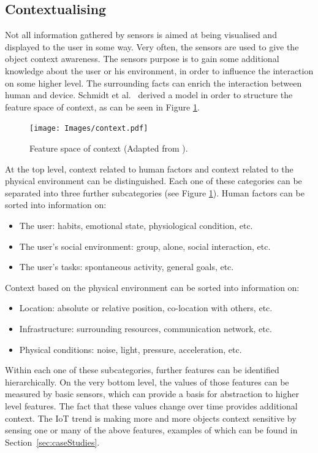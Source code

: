 \subsection{Contextualising}
Not all information gathered by sensors is aimed at being visualised and displayed to the user in some way. 
Very often, the sensors are used to give the object context awareness.
The sensors purpose is to gain some additional knowledge about the user or his environment, in order to influence the interaction on some higher level. 
The surrounding facts can enrich the interaction between human and device. 
Schmidt et al.\ \cite{schmidt99} derived a model in order to structure the feature space of context, as can be seen in Figure \ref{fig:context}.

\begin{figure}[!t]
	\centering
	\texttt{[image: Images/context.pdf]}
	\caption{Feature space of context (Adapted from \cite{schmidt99}).}
	\label{fig:context}
\end{figure}

At the top level, context related to human factors and context related to the physical environment can be distinguished. Each one of these categories can be separated into three further subcategories (see Figure \ref{fig:context}). Human factors can be sorted into information on:

\begin{itemize}
	\item The user: habits, emotional state, physiological condition, etc.
	\item The user's social environment: group, alone, social interaction, etc.
	\item The user's tasks: spontaneous activity, general goals, etc.
\end{itemize}

Context based on the physical environment can be sorted into information on:
\begin{itemize}
	\item Location: absolute or relative position, co-location with others, etc.
	\item Infrastructure: surrounding resources, communication network, etc.
	\item Physical conditions: noise, light, pressure, acceleration, etc.
\end{itemize}

Within each one of these subcategories, further features can be identified hierarchically. 
On the very bottom level, the values of those features can be measured by basic sensors, which can provide a basis for abstraction to higher level features. 
The fact that these values change over time provides additional context. 
The IoT trend is making more and more objects context sensitive by sensing one or many of the above features, examples of which can be found in Section~\ref{sec:caseStudies}.

